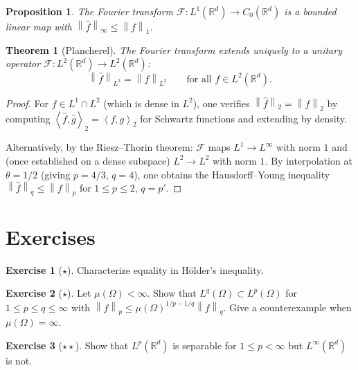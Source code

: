 \documentclass[a4paper,12pt]{book}
\newcommand{\R}{\mathbb{R}}
\newcommand{\norm}[1]{\left\| #1 \right\|}
\newcommand{\inner}[2]{\left\langle #1, #2 \right\rangle}
\theoremstyle{definition}
\newtheorem{exercise}{Exercise}[chapter]
\theoremstyle{plain}
\newtheorem{theorem}[definition]{Theorem}
\newtheorem{proposition}[definition]{Proposition}
\theoremstyle{remark}
\begin{document}
\begin{proposition}\label{prop:fourier-L1}
The Fourier transform $\mathcal{F} \colon L^1(\R^d) \to C_0(\R^d)$ is a bounded
linear map with $\norm{\hat{f}}_\infty \le \norm{f}_1$.
\end{proposition}

\begin{theorem}[Plancherel]\label{thm:plancherel}
The Fourier transform extends uniquely to a unitary operator
$\mathcal{F} \colon L^2(\R^d) \to L^2(\R^d)$:
\[
  \norm{\hat{f}}_{L^2} = \norm{f}_{L^2} \qquad \text{for all } f \in L^2(\R^d).
\]
\end{theorem}

\begin{proof}
For $f \in L^1 \cap L^2$ (which is dense in $L^2$), one verifies
$\norm{\hat{f}}_2 = \norm{f}_2$ by computing
$\inner{\hat{f}}{\hat{g}}_2 = \inner{f}{g}_2$ for Schwartz functions and
extending by density.

Alternatively, by the Riesz--Thorin theorem: $\mathcal{F}$ maps $L^1 \to L^\infty$
with norm $1$ and (once established on a dense subspace) $L^2 \to L^2$ with norm $1$.
By interpolation at $\theta = 1/2$ (giving $p = 4/3$, $q = 4$), one obtains the
Hausdorff--Young inequality
$\norm{\hat{f}}_q \le \norm{f}_p$ for $1 \le p \le 2$, $q = p'$.
\end{proof}


\section{Exercises}

\begin{exercise}[$\star$]\label{exo:holder-equality}
Characterize equality in H\"older's inequality.
\end{exercise}

\begin{exercise}[$\star$]\label{exo:Lp-inclusions}
Let $\mu(\Omega) < \infty$. Show that $L^q(\Omega) \subset L^p(\Omega)$ for
$1 \le p \le q \le \infty$ with $\norm{f}_p \le \mu(\Omega)^{1/p - 1/q}\norm{f}_q$.
Give a counterexample when $\mu(\Omega) = \infty$.
\end{exercise}

\begin{exercise}[$\star\star$]\label{exo:Lp-separable}
Show that $L^p(\R^d)$ is separable for $1 \le p < \infty$ but $L^\infty(\R^d)$
is not.
\end{exercise}
\end{document}
